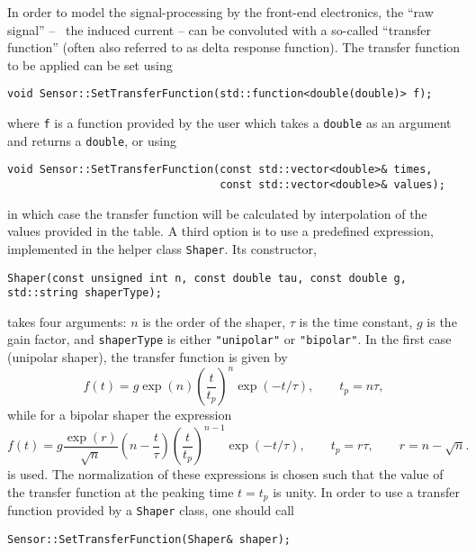 In order to model the signal-processing by the front-end electronics, the 
``raw signal'' -- \ie~the induced current -- 
can be convoluted with a so-called ``transfer function'' (often also referred 
to as delta response function). 
The transfer function to be applied can be set using
\begin{lstlisting}
void Sensor::SetTransferFunction(std::function<double(double)> f);
\end{lstlisting}
where \texttt{f} is a function provided by the user which takes a \texttt{double} as an argument and returns a \texttt{double}, or using
\begin{lstlisting}
void Sensor::SetTransferFunction(const std::vector<double>& times,
                                 const std::vector<double>& values);
\end{lstlisting}
in which case the transfer function will be calculated by 
interpolation of the values provided in the table.
A third option is to use a predefined expression, implemented in 
the helper class \texttt{Shaper}. Its constructor,
\begin{lstlisting}
Shaper(const unsigned int n, const double tau, const double g, std::string shaperType);
\end{lstlisting}
takes four arguments: $n$ is the order of the shaper, 
$\tau$ is the time constant, $g$ is the gain factor, 
and \texttt{shaperType} is either \texttt{"unipolar"} or \texttt{"bipolar"}.
In the first case (unipolar shaper), the transfer function is given by
\begin{equation*}
  f\left(t\right) = g \exp\left(n\right)\left(\frac{t}{t_{p}}\right)^{n}
                    \exp\left(-t / \tau\right), \qquad t_{p} = n\tau,
\end{equation*} 
while for a bipolar shaper the expression
\begin{equation*}
  f\left(t\right) = g \frac{\exp\left(r\right)}{\sqrt{n}} \left(n - \frac{t}{\tau}\right)
                    \left(\frac{t}{t_{p}}\right)^{n - 1} 
                    \exp\left(-t / \tau\right), \qquad t_{p} = r\tau, \qquad r = n - \sqrt{n}.
\end{equation*}
is used. The normalization of these expressions is chosen such that the  
value of the transfer function at the peaking time $t = t_{p}$ is unity.
In order to use a transfer function provided by a \texttt{Shaper} class,
one should call
\begin{lstlisting}
Sensor::SetTransferFunction(Shaper& shaper);
\end{lstlisting}

